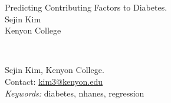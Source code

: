 \documentclass[letter,12pt]{article}
\begin{document}
	\thispagestyle{plain}
	\begin{center}
		\vspace*{150pt}
		Predicting Contributing Factors to Diabetes. \\
		Sejin Kim \\
		Kenyon College \\
	\end{center}
	\vspace*{120pt}
	 \\
	\begin{raggedright}
		Sejin Kim, Kenyon College. \\
		Contact: \href{mailto:kim3@kenyon.edu}{kim3@kenyon.edu} \\
		\vspace*{40pt}
		\textit{Keywords:} diabetes, nhanes, regression
	\end{raggedright}
	
	\newpage
\end{document}
